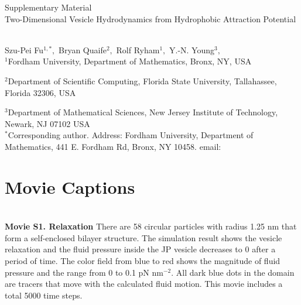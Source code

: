 
\thispagestyle{empty}

\newpage
{\Large \bf

  \noindent Supplementary Material\\

  \noindent 
  Two-Dimensional Vesicle Hydrodynamics from Hydrophobic Attraction Potential}\\

\noindent 
Szu-Pei Fu$^{1,*},$ 
Bryan Quaife$^{2},$ 
Rolf Ryham$^{1},$ 
Y.-N. Young$^{3},$
\\


\noindent
$^{1}$Fordham University, Department of Mathematics,  Bronx, NY, USA

\noindent
$^{2}$Department of Scientific Computing, Florida State University, Tallahassee, Florida 32306, USA

\noindent
$^{3}$Department of Mathematical Sciences, New Jersey Institute of Technology, Newark, NJ  07102 USA
\\

\noindent $^*$Corresponding author. Address: Fordham University, Department of Mathematics, 441 E. Fordham Rd, Bronx, NY 10458. email: 



\setcounter{page}{1}

\setcounter{figure}{0}
\renewcommand{\thefigure}{S\arabic{figure}}

\setcounter{equation}{0}
\renewcommand{\theequation}{S\arabic{equation}}

\setcounter{section}{0}
\renewcommand{\thesection}{S\arabic{section}}   





\sloppy
\section{Movie Captions}\mbox{} \\

\noindent
{\bf Movie S1. Relaxation} There are 58 circular particles with radius 1.25 nm that form a self-enclosed bilayer structure. The simulation result shows the vesicle relaxation and the fluid pressure inside the JP vesicle decreases to 0 after a period of time.
The color field from blue to red shows the magnitude of fluid pressure and the range from 0 to 0.1 pN nm$^{-2}$. All dark blue dots in the domain are tracers that move with the calculated fluid motion.
This movie includes a total 5000 time steps. \\



